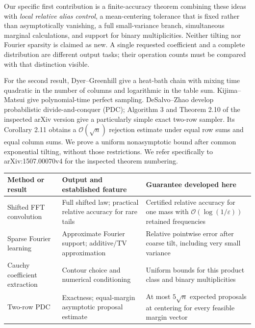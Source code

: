 \documentclass[11pt,a4paper]{article}
\theoremstyle{definition}
\newcommand{\BigO}{\mathcal O}
\begin{document}
Our specific first contribution is a finite-accuracy theorem combining these ideas with \emph{local relative alias control}, a mean-centering tolerance that is fixed rather than asymptotically vanishing, a full small-variance branch, simultaneous marginal calculations, and support for binary multiplicities. Neither tilting nor Fourier sparsity is claimed as new. A single requested coefficient and a complete distribution are different output tasks; their operation counts must be compared with that distinction visible.

For the second result, Dyer--Greenhill \cite{dg} give a heat-bath chain with mixing time quadratic in the number of columns and logarithmic in the table sum. Kijima--Matsui \cite{km} give polynomial-time perfect sampling. DeSalvo--Zhao \cite{dz} develop probabilistic divide-and-conquer (PDC); Algorithm 3 and Theorem 2.10 of the inspected arXiv version give a particularly simple exact two-row sampler. Its Corollary 2.11 obtains a $\BigO(\sqrt n)$ rejection estimate under equal row sums and equal column sums. We prove a uniform nonasymptotic bound after common exponential tilting, without those restrictions. We refer specifically to arXiv:1507.00070v4 for the inspected theorem numbering.

\begin{center}
\small
\begin{tabularx}{\textwidth}{@{}p{}XX@{}}
\toprule
Method or result & Output and established feature & Guarantee developed here \\
\midrule
Shifted FFT convolution \cite{plk} & Full shifted law; practical relative accuracy for rare tails & Certified relative accuracy for one mass with $\BigO(\log(1/\varepsilon))$ retained frequencies \\
Sparse Fourier learning \cite{dks} & Approximate Fourier support; additive/TV approximation & Relative pointwise error after coarse tilt, including very small variance \\
Cauchy coefficient extraction \cite{bornemann} & Contour choice and numerical conditioning & Uniform bounds for this product class and binary multiplicities \\
Two-row PDC \cite{dz} & Exactness; equal-margin asymptotic proposal estimate & At most $5\sqrt n$ expected proposals at centering for every feasible margin vector \\
\bottomrule
\end{tabularx}
\end{center}
\end{document}
